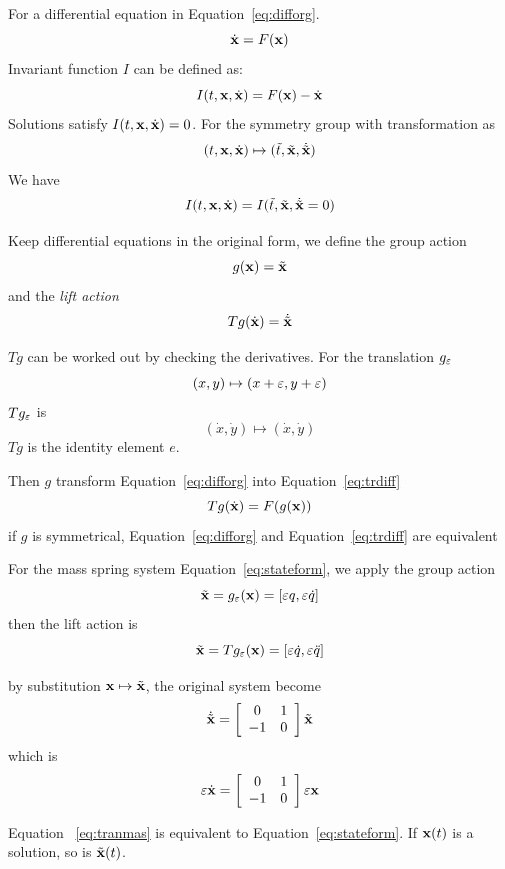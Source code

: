 For a differential equation in Equation~\ref{eq:difforg}.
\begin{equation}
\label{eq:difforg}
\dot{\mathbf{x}}=F(\mathbf{x})
\end{equation}
Invariant function $I$ can be defined as:
\[
I(t,\mathbf{x},\dot{\mathbf{x}})=F(\mathbf{x})-\dot{\mathbf{x}}
\]
Solutions satisfy $I(t,\mathbf{x},\dot{\mathbf{x}})=0$.
For the symmetry group with transformation as 
\[
(t,\mathbf{x},\dot{\mathbf{x}}) \mapsto (\tilde{t},\tilde{\mathbf{x}},\dot{\tilde{\mathbf{x}}})
\]
We have
\[
I(t,\mathbf{x},\dot{\mathbf{x}})=I(\tilde{t},\tilde{\mathbf{x}},\dot{\tilde{\mathbf{x}}}=0)
\]

Keep differential equations in the original form, we define the group action 
\[
g(\mathbf{x})=\tilde{\mathbf{x}}
\]
and the \emph{lift action} 
\[
Tg(\dot{\mathbf{x}})=\dot{\tilde{\mathbf{x}}}
\]

$Tg$ can be worked out by checking the derivatives.
For the translation $g_{\varepsilon}$ 
\[
(x,y)\mapsto (x+\varepsilon,y+\varepsilon)
\]
$Tg_{\varepsilon}$ is
\[
(\dot{x},\dot{y}) \mapsto (\dot{x},\dot{y})
\]
$Tg$ is the identity element $e$.


Then $g$ transform Equation~\ref{eq:difforg} into Equation~\ref{eq:trdiff}
\begin{equation}
\label{eq:trdiff}
Tg(\dot{\mathbf{x}})=F(g(\mathbf{x}))
\end{equation}
if $g$ is symmetrical, Equation~\ref{eq:difforg} and Equation~\ref{eq:trdiff} are equivalent







 	
For the mass spring system Equation~\ref{eq:stateform}, we apply the group action 
\[
\tilde{\mathbf{x}}=g_{\varepsilon}(\mathbf{x})=[\varepsilon q, \varepsilon \dot{q} ]
\]
then the lift action is
\[
\tilde{\mathbf{x}}=Tg_{\varepsilon}(\mathbf{x})=[\varepsilon \dot{q}, \varepsilon \ddot{q}]
\]



by substitution $\mathbf{x} \mapsto \tilde{\mathbf{x}}$, the original system become
\[ 
\dot{\tilde{\mathbf{x}}}=
\left[ 
\begin{array}{cc}
0 &1\\
-1 &0 
\end{array}
\right]\tilde{\mathbf{x}}
\]
which is 
\begin{equation}
\label{eq:tranmas} 
\varepsilon \dot{\mathbf{x}}=
\left[ 
\begin{array}{cc}
0 &1\\
-1 &0 
\end{array}
\right]\varepsilon \mathbf{x}
\end{equation}

Equation ~\ref{eq:tranmas} is equivalent to  Equation~\ref{eq:stateform}.
If $\mathbf{x}(t)$ is a solution, so is $\tilde{\mathbf{x}}(t)$.

